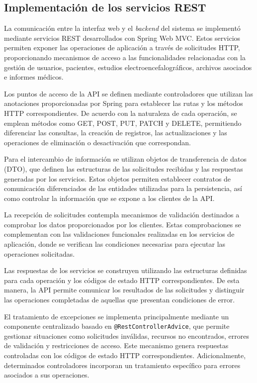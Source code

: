 \FloatBarrier


\subsection{Implementación de los servicios REST}

La comunicación entre la interfaz web y el \textit{backend}
del sistema se implementó mediante servicios REST
desarrollados con Spring Web MVC. Estos servicios
permiten exponer las operaciones de aplicación
a través de solicitudes HTTP, proporcionando
mecanismos de acceso a las funcionalidades
relacionadas con la gestión de usuarios,
pacientes, estudios electroencefalográficos,
archivos asociados e informes médicos.

Los puntos de acceso de la API se definen mediante
controladores que utilizan las anotaciones
proporcionadas por Spring para establecer las
rutas y los métodos HTTP correspondientes.
De acuerdo con la naturaleza de cada operación,
se emplean métodos como GET, POST, PUT, PATCH
y DELETE, permitiendo diferenciar las consultas,
la creación de registros, las actualizaciones
y las operaciones de eliminación o desactivación
que correspondan.

Para el intercambio de información se utilizan
objetos de transferencia de datos (DTO), que
definen las estructuras de las solicitudes
recibidas y las respuestas generadas por los
servicios. Estos objetos permiten establecer
contratos de comunicación diferenciados de
las entidades utilizadas para la persistencia,
así como controlar la información que se
expone a los clientes de la API.

La recepción de solicitudes contempla mecanismos
de validación destinados a comprobar los datos
proporcionados por los clientes. Estas
comprobaciones se complementan con las
validaciones funcionales realizadas en los
servicios de aplicación, donde se verifican
las condiciones necesarias para ejecutar
las operaciones solicitadas.

Las respuestas de los servicios se construyen
utilizando las estructuras definidas para
cada operación y los códigos de estado HTTP
correspondientes. De esta manera, la API
permite comunicar los resultados de las
solicitudes y distinguir las operaciones
completadas de aquellas que presentan
condiciones de error.


El tratamiento de excepciones se implementa
principalmente mediante un componente centralizado
basado en \texttt{@RestControllerAdvice}, que
permite gestionar situaciones como solicitudes
inválidas, recursos no encontrados, errores de
validación y restricciones de acceso. Este
mecanismo genera respuestas controladas con
los códigos de estado HTTP correspondientes.
Adicionalmente, determinados controladores
incorporan un tratamiento específico para
errores asociados a sus operaciones.


